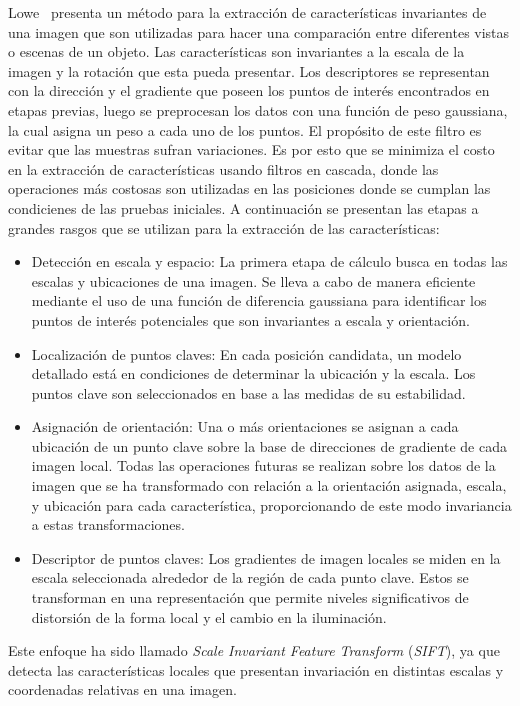 Lowe~\cite{sift2004} presenta un método para la extracción de características invariantes de una imagen que son utilizadas para hacer una comparación entre diferentes vistas o escenas de un objeto. Las características son invariantes a la escala de la imagen y la rotación que esta pueda presentar. Los descriptores se representan con la dirección y el gradiente que poseen los puntos de interés encontrados en etapas previas, luego se preprocesan los datos con una función de peso gaussiana, la cual asigna un peso a cada uno de los puntos. El propósito de este filtro es evitar que las muestras sufran variaciones. Es por esto que se minimiza el costo en la extracción de características usando filtros en cascada, donde las operaciones más costosas son utilizadas en las posiciones donde se cumplan las condicienes de las pruebas iniciales. A continuación se presentan las etapas a grandes rasgos que se utilizan para la extracción de las características:
\begin{itemize}
\item Detección en escala y espacio: La primera etapa de cálculo busca en todas las escalas y ubicaciones de una imagen. Se lleva a cabo de manera eficiente mediante el uso de una función de diferencia gaussiana para identificar los puntos de interés potenciales que son invariantes a escala y orientación.
\item Localización de puntos claves: En cada posición candidata, un modelo detallado está en condiciones de determinar la ubicación y la escala. Los puntos clave son seleccionados en base a las medidas de su estabilidad.
\item Asignación de orientación: Una o más orientaciones se asignan a cada ubicación de un punto clave sobre la base de direcciones de gradiente de cada imagen local. Todas las operaciones futuras se realizan sobre los datos de la imagen que se ha transformado con relación a la orientación asignada, escala, y ubicación para cada característica, proporcionando de este modo invariancia a estas transformaciones.
\item Descriptor de puntos claves: Los gradientes de imagen locales se miden en la escala seleccionada alrededor de la región de cada punto clave. Estos se transforman en una representación que permite niveles significativos de distorsión de la forma local y el cambio en la iluminación.
\end{itemize}
Este enfoque ha sido llamado \textit{Scale Invariant Feature Transform} (\textit{SIFT}), ya que detecta las características locales que presentan invariación en distintas escalas y coordenadas relativas en una imagen.

